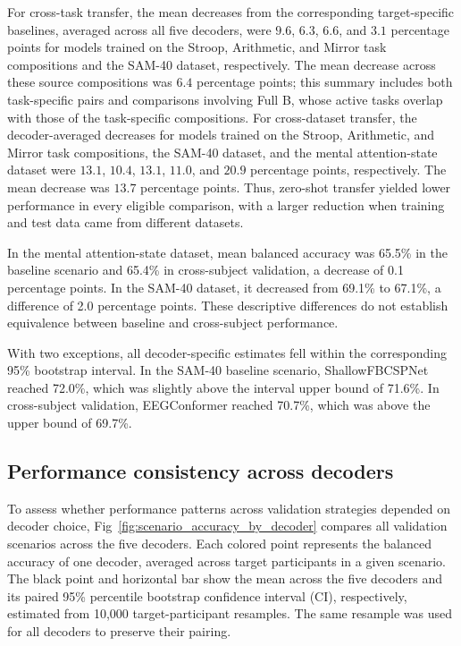 \documentclass[10pt,letterpaper]{article}
\begin{document}


For cross-task transfer, the mean decreases from the corresponding
target-specific baselines, averaged across all five decoders, were $9.6$,
$6.3$, $6.6$, and $3.1$ percentage points for models trained on the Stroop, Arithmetic, and
Mirror task compositions and the SAM-40 dataset, respectively. The mean
decrease across these source compositions was $6.4$ percentage points; this summary
includes both task-specific pairs and comparisons involving Full B, whose active
tasks overlap with those of the task-specific compositions. For cross-dataset
transfer, the decoder-averaged decreases for models trained on the Stroop,
Arithmetic, and Mirror task compositions, the SAM-40 dataset, and the mental
attention-state dataset were $13.1$, $10.4$, $13.1$, $11.0$, and $20.9$ percentage points,
respectively. The mean decrease was $13.7$ percentage points. Thus, zero-shot
transfer yielded lower performance in every eligible comparison, with a larger
reduction when training and test data came from
different datasets.



In the mental attention-state dataset, mean balanced accuracy was 65.5\% in the
baseline scenario and 65.4\% in cross-subject validation, a decrease of 0.1
percentage points. In the SAM-40 dataset, it decreased from 69.1\% to 67.1\%,
a difference of 2.0 percentage points. These descriptive differences do not
establish equivalence between baseline and cross-subject performance.

With two exceptions, all decoder-specific estimates fell within the
corresponding 95\% bootstrap interval. In the SAM-40 baseline scenario,
ShallowFBCSPNet reached 72.0\%, which was slightly above the interval upper
bound of 71.6\%. In cross-subject validation, EEGConformer reached 70.7\%,
which was above the upper bound of 69.7\%.

\subsection*{Performance consistency across decoders}

To assess whether performance patterns across validation strategies depended on
decoder choice, Fig~\ref{fig:scenario_accuracy_by_decoder} compares all
validation scenarios across the five decoders. Each colored point represents
the balanced accuracy of one decoder, averaged across target participants in a
given scenario. The black point and horizontal bar show the mean
across the five decoders and its paired 95\% percentile bootstrap confidence
interval (CI), respectively, estimated from 10,000 target-participant
resamples. The same resample was used for all decoders to preserve their
pairing.
\end{document}
